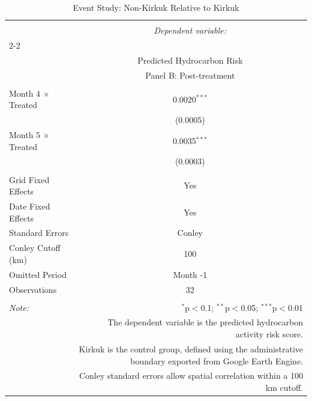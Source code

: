 
\begin{table}[!htbp] \centering 
  \caption{Event Study: Non-Kirkuk Relative to Kirkuk} 
  \label{tab:eventstudy_full_B} 
\scriptsize 
\begin{tabular}{@{\extracolsep{5pt}}lc} 
\\[-1.8ex]\hline 
\hline \\[-1.8ex] 
 & \multicolumn{1}{c}{\textit{Dependent variable:}} \\ 
\cline{2-2} 
\\[-1.8ex] & Predicted Hydrocarbon Risk \\ 
 & Panel B: Post-treatment \\ 
\hline \\[-1.8ex] 
 Month 4 × Treated & 0.0020$^{***}$ \\ 
  & (0.0005) \\ 
  Month 5 × Treated & 0.0035$^{***}$ \\ 
  & (0.0003) \\ 
 \hline \\[-1.8ex] 
Grid Fixed Effects & Yes \\ 
Date Fixed Effects & Yes \\ 
Standard Errors & Conley \\ 
Conley Cutoff (km) & 100 \\ 
Omitted Period & Month -1 \\ 
Observations & 32 \\ 
\hline 
\hline \\[-1.8ex] 
\textit{Note:}  & \multicolumn{1}{r}{$^{*}$p$<$0.1; $^{**}$p$<$0.05; $^{***}$p$<$0.01} \\ 
 & \multicolumn{1}{r}{The dependent variable is the predicted hydrocarbon activity risk score.} \\ 
 & \multicolumn{1}{r}{Kirkuk is the control group, defined using the administrative boundary exported from Google Earth Engine.} \\ 
 & \multicolumn{1}{r}{Conley standard errors allow spatial correlation within a 100 km cutoff.} \\ 
\end{tabular} 
\end{table} 
